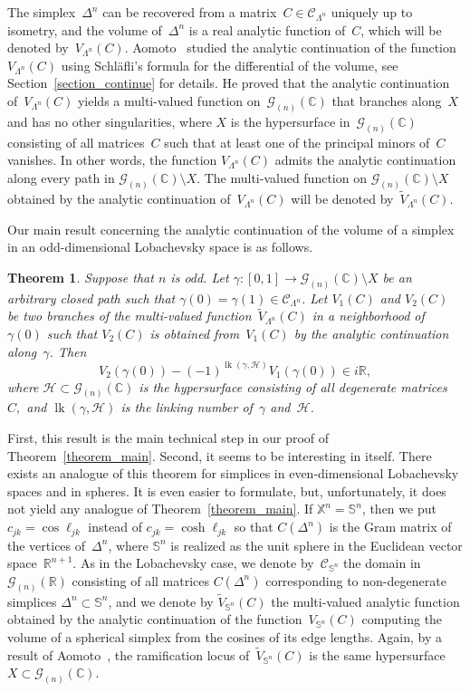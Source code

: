 \documentclass[reqno,tbtags,12pt]{amsart}
\numberwithin{equation}{section}
\newcommand{\R}{\mathbb{R}}
\newcommand{\CH}{\mathcal{H}}
\newcommand{\CC}{\mathcal{C}}
\newcommand{\C}{\mathbb{C}}
\newcommand{\X}{\mathbb{X}}
\newcommand{\bS}{\mathbb{S}}
\newcommand{\tV}{\widetilde{V}}
\newcommand{\CG}{\mathcal{G}}
\newcommand{\lk}{\mathop{\mathrm{lk}}\nolimits}
\newtheorem{theorem}{Theorem}[section]
\theoremstyle{definition}
\begin{document}
The simplex~$\Delta^n$ can be recovered from a matrix~$C\in\CC_{\Lambda^n}$ uniquely up to isometry, and the volume of~$\Delta^n$ is a real analytic function of~$C$, which will be denoted by~$V_{\Lambda^n}(C)$. Aomoto~\cite{Aom77} studied the analytic continuation of the function~$V_{\Lambda^n}(C)$ using Schl\"afli's formula for the differential of the volume, see Section~\ref{section_continue} for details. He proved that the analytic continuation of~$V_{\Lambda^n}(C)$ yields a multi-valued function on~$\CG_{(n)}(\C)$ that branches along~$X$ and has no other singularities, where $X$ is the hypersurface in~$\CG_{(n)}(\C)$ consisting of all matrices~$C$ such that at least one of the principal minors of~$C$ vanishes. 
In other words, the function $V_{\Lambda^n}(C)$ admits the analytic continuation along every path in $\CG_{(n)}(\C)\setminus X$. The multi-valued function on $\CG_{(n)}(\C)\setminus X$ obtained by the analytic continuation of~$V_{\Lambda^n}(C)$ will be denoted by~$\tV_{\Lambda^n}(C)$.  
 
Our main result concerning the analytic continuation of the volume of a simplex in an odd-dimensional Lobachevsky space is as follows. 

\begin{theorem}\label{theorem_key}
Suppose that $n$ is odd.   Let $\gamma\colon[0,1]\to \CG_{(n)}(\C)\setminus X$ be an arbitrary closed path such that\/ $\gamma(0)=\gamma(1)\in\CC_{\Lambda^n}$. Let $V_1(C)$ and $V_2(C)$ be two branches of the multi-valued function~$\tV_{\Lambda^n}(C)$ in a neighborhood of\/~$\gamma(0)$ such that\/ $V_2(C)$ is obtained from~$V_1(C)$ by the analytic continuation along~$\gamma$. Then 
\begin{equation*}
V_2(\gamma(0))-(-1)^{\lk(\gamma,\CH)}V_1(\gamma(0))\in i\R,
\end{equation*}
where $\CH\subset \CG_{(n)}(\C)$ is the hypersurface consisting of all degenerate matrices~$C,$ and\/ $\lk(\gamma,\CH)$ is the linking number of\/~$\gamma$ and~$\CH$. 
\end{theorem}

First, this result is the main technical step in our proof of Theorem~\ref{theorem_main}. Second, it seems to be interesting in itself.  There exists an analogue of this theorem for simplices in even-dimensional Lobachevsky spaces and in spheres. It is even easier to formulate, but, unfortunately, it does not yield any analogue of Theorem~\ref{theorem_main}. If $\X^n=\bS^n$, then we put $c_{jk}=\cos\ell_{jk}$ instead of $c_{jk}=\cosh\ell_{jk}$ so that $C(\Delta^n)$ is the Gram matrix of the vertices of~$\Delta^n$, where $\bS^n$ is realized as the unit sphere in the Euclidean vector space~$\R^{n+1}$. As in the Lobachevsky case, we denote by~$\CC_{\bS^n}$ the domain in~$\CG_{(n)}(\R)$ consisting of all matrices $C(\Delta^n)$ corresponding to non-degenerate simplices $\Delta^n\subset\bS^n$, and we denote by $\tV_{\bS^n}(C)$ the multi-valued analytic function obtained by the analytic continuation of the function~$V_{\bS^n}(C)$ computing the volume of a spherical simplex from the cosines of its edge lengths. Again, by a result of Aomoto~\cite{Aom77}, the ramification locus of~$\tV_{\bS^n}(C)$  is the same hypersurface~$X\subset \CG_{(n)}(\C)$. 
\end{document}

